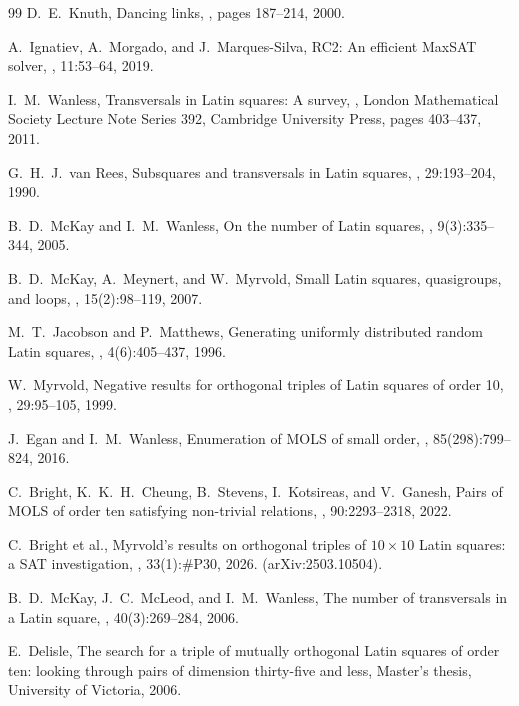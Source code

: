 \documentclass[11pt,a4paper]{article}
\theoremstyle{remark}
\begin{document}
\begin{thebibliography}{99}
D.~E.~Knuth,
\newblock Dancing links,
, pages 187--214,
  2000.

A.~Ignatiev, A.~Morgado, and J.~Marques-Silva,
\newblock RC2: An efficient MaxSAT solver,
,
  11:53--64, 2019.

I.~M.~Wanless,
\newblock Transversals in Latin squares: A survey,
, London Mathematical Society
  Lecture Note Series 392, Cambridge University Press, pages 403--437, 2011.

G.~H.~J.~van Rees,
\newblock Subsquares and transversals in Latin squares,
, 29:193--204, 1990.

B.~D.~McKay and I.~M.~Wanless,
\newblock On the number of Latin squares,
, 9(3):335--344, 2005.

B.~D.~McKay, A.~Meynert, and W.~Myrvold,
\newblock Small Latin squares, quasigroups, and loops,
, 15(2):98--119, 2007.

M.~T.~Jacobson and P.~Matthews,
\newblock Generating uniformly distributed random Latin squares,
, 4(6):405--437, 1996.

W.~Myrvold,
\newblock Negative results for orthogonal triples of Latin squares of order 10,
, 29:95--105, 1999.

J.~Egan and I.~M.~Wanless,
\newblock Enumeration of MOLS of small order,
, 85(298):799--824, 2016.

C.~Bright, K.~K.~H.~Cheung, B.~Stevens, I.~Kotsireas, and V.~Ganesh,
\newblock Pairs of MOLS of order ten satisfying non-trivial relations,
, 90:2293--2318, 2022.

C.~Bright et al.,
\newblock Myrvold's results on orthogonal triples of $10 \times 10$ Latin
squares: a SAT investigation,
, 33(1):\#P30, 2026.
(arXiv:2503.10504).

B.~D.~McKay, J.~C.~McLeod, and I.~M.~Wanless,
\newblock The number of transversals in a Latin square,
, 40(3):269--284, 2006.

E.~Delisle,
\newblock The search for a triple of mutually orthogonal Latin squares of
order ten: looking through pairs of dimension thirty-five and less,
\newblock Master's thesis, University of Victoria, 2006.

\end{thebibliography}
\end{document}
